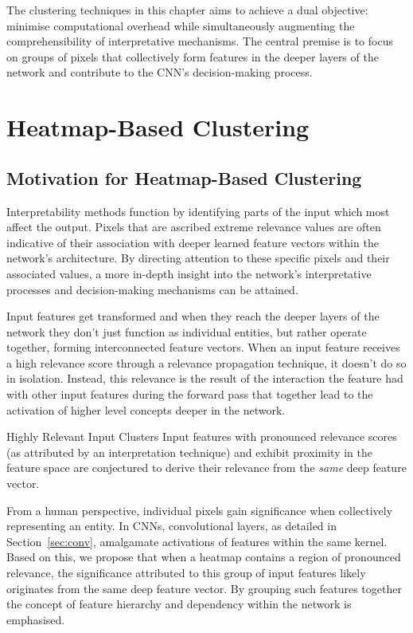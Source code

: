 The clustering techniques in this chapter aims to achieve a dual objective: minimise computational overhead while simultaneously augmenting the comprehensibility of interpretative mechanisms. The central premise is to focus on groups of pixels that collectively form features in the deeper layers of the network and contribute to the CNN's decision-making process.

\section{Heatmap-Based Clustering}
\label{heatmap_clustering}

\subsection{Motivation for Heatmap-Based Clustering}

Interpretability methods function by identifying parts of the input which most affect the output. Pixels that are ascribed extreme relevance values are often indicative of their association with deeper learned feature vectors within the network's architecture. By directing attention to these specific pixels and their associated values, a more in-depth insight into the network's interpretative processes and decision-making mechanisms can be attained.

Input features get transformed and when they reach the deeper layers of the network they don't just function as individual entities, but rather operate together, forming interconnected feature vectors. When an input feature receives a high relevance score through a relevance propagation technique, it doesn't do so in isolation. Instead, this relevance is the result of the interaction the feature had with other input features during the forward pass that together lead to the activation of higher level concepts deeper in the network.

\begin{Conjecture}{Highly Relevant Input Clusters}{}
Input features with pronounced relevance scores (as attributed by an interpretation technique) and exhibit proximity in the feature space are conjectured to derive their relevance from the \textit{same} deep feature vector. 
\end{Conjecture} 

From a human perspective, individual pixels gain significance when collectively representing an entity. In CNNs, convolutional layers, as detailed in Section~\ref{sec:conv}, amalgamate activations of features within the same kernel. Based on this, we propose that when a heatmap contains a region of pronounced relevance, the significance attributed to this group of input features likely originates from the same deep feature vector. By grouping such features together the concept of feature hierarchy and dependency within the network is emphasised.

